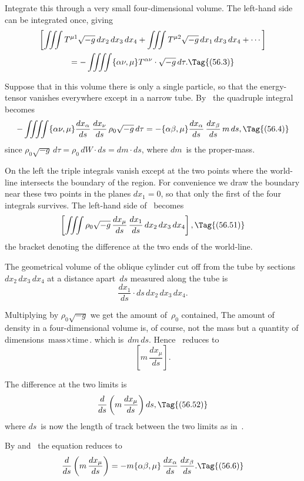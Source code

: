 \documentclass[12pt]{book}
\begin{document}
Integrate this through a very small four\hyp{}dimensional volume. The left-hand
side can be integrated once, giving
\begin{multline*}
  \left[\iiint T^{\mu1} \sqrt{-g}\, dx_{2}\, dx_{3}\, dx_{4}
    + \iiint T^{\mu2} \sqrt{-g}\, dx_{1}\, dx_{3}\, dx_{4} + \cdots\right] \\
  = -\iiiint \{\alpha\nu, \mu\} T^{\alpha\nu} \cdot \sqrt{-g}\, d\tau.
  \Tag{(56.3)}
\end{multline*}

Suppose that in this volume there is only a single particle, so that the
energy\hyp{}tensor vanishes everywhere except in a narrow tube. By~ the
quadruple integral becomes
\[
-\iiiint \{\alpha\nu, \mu\} \frac{dx_{\alpha}}{ds}\, \frac{dx_{\nu}}{ds}\, \rho_{0} \sqrt{-g}\, d\tau
= -\{\alpha\beta, \mu\} \frac{dx_{\alpha}}{ds}\, \frac{dx_{\beta}}{ds}\, m\, ds,
\Tag{(56.4)}
\]
since $\rho_{0} \sqrt{-g}\, d\tau = \rho_{0}\, dW \cdot ds = dm \cdot ds$, where $dm$~is the proper\hyp{}mass.

On the left the triple integrals vanish except at the two points where the
world-line intersects the boundary of the region. For convenience we draw
the boundary near these two points in the planes $dx_{1} = 0$, so that only the first
of the four integrals survives. The left-hand side of~ becomes
\[
\left[\iiint \rho_{0} \sqrt{-g}\, \frac{dx_{\mu}}{ds}\, \frac{dx_{1}}{ds}\, dx_{2}\, dx_{3}\, dx_{4}\right],
\Tag{(56.51)}
\]
the bracket denoting the difference at the two ends of the world-line.

The geometrical volume of the oblique cylinder cut off from the tube by
sections $dx_{2}\, dx_{3}\, dx_{4}$ at a distance apart~$ds$ measured along the tube is
\[
\frac{dx_{1}}{ds} \cdot ds\, dx_{2}\, dx_{3}\, dx_{4}.
\]

Multiplying by $\rho_{0} \sqrt{-g}$ we get the amount of~$\rho_{0}$ contained\footnotemark,\footnotetext
  {The amount of density in a four\hyp{}dimensional volume is, of course, not the mass but a
  quantity of dimensions $\text{mass} \times \text{time}$.}
which is~$dm\, ds$.
Hence ~reduces to
\[
\left[m\, \frac{dx_{\mu}}{ds}\right].
\]

The difference at the two limits is
\[
\frac{d}{ds} \left(m\, \frac{dx_{\mu}}{ds}\right) ds,
\Tag{(56.52)}
\]
where $ds$~is now the length of track between the two limits as in~.

By  and~ the equation reduces to
\[
\frac{d}{ds} \left(m\, \frac{dx_{\mu}}{ds}\right)
= -m \{\alpha\beta, \mu\}\, \frac{dx_{\alpha}}{ds}\, \frac{dx_{\beta}}{ds}.
\Tag{(56.6)}
\]
\end{document}
